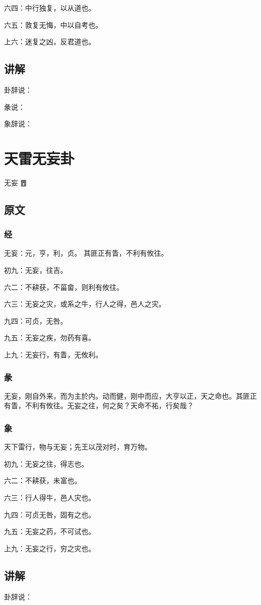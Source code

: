 \documentclass[12pt,oneside]{book}
\begin{document}
六四：中行独复，以从道也。

六五：敦复无悔，中以自考也。

上六：迷复之凶，反君道也。

\section{讲解}
卦辞说：

彖说：

象辞说：

\chapter{天雷无妄卦}
无妄 {\Large ䷘}

\section{原文}
\subsection{经}
无妄：元，亨，利，贞。 其匪正有眚，不利有攸往。

初九：无妄，往吉。

六二：不耕获，不菑畲，则利有攸往。

六三：无妄之灾，或系之牛，行人之得，邑人之灾。

九四：可贞，无咎。

九五：无妄之疾，勿药有喜。

上九：无妄行，有眚，无攸利。

\subsection{彖}
无妄，刚自外来，而为主於内。动而健，刚中而应，大亨以正，天之命也。其匪正有眚，不利有攸往。无妄之往，何之矣？天命不祐，行矣哉？
\subsection{象}
天下雷行，物与无妄；先王以茂对时，育万物。

初九：无妄之往，得志也。

六二：不耕获，未富也。

六三：行人得牛，邑人灾也。

九四：可贞无咎，固有之也。

九五：无妄之药，不可试也。

上九：无妄之行，穷之灾也。

\section{讲解}
卦辞说：
\end{document}
